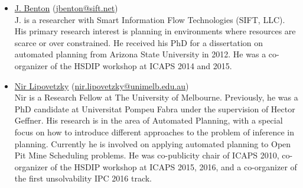 \documentclass[10pt]{article}
\begin{document}
\begin{itemize}


\item \href{http://www.sift.net/staff/j-benton}{J. Benton}
  (\href{mailto:jbenton@sift.net}{jbenton@sift.net})\\
  J. is a researcher with Smart Information Flow Technologies (SIFT, LLC). His
  primary research interest is planning in environments where
  resources are scarce or over constrained.  He received his PhD for a
  dissertation on automated planning from Arizona State University in
  2012. He was a co-organizer of the HSDIP workshop at
  ICAPS 2014 and 2015.

%


\item \href{http://people.eng.unimelb.edu.au/nlipovetzky/}{Nir Lipovetzky}
  (\href{mailto:nir.lipovetzky@unimelb.edu.au}{nir.lipovetzky@unimelb.edu.au})\\
Nir is a Research Fellow at The University of Melbourne. Previously, he was a
PhD candidate at Universitat Pompeu Fabra under the supervision of Hector Geffner.
His research is in the area of Automated Planning, with a special focus on how
to introduce different approaches to the problem of inference in planning.
Currently he is involved on applying automated planning to Open Pit Mine
Scheduling problems. He was co-publicity chair of ICAPS 2010, co-organizer
of the HSDIP workshop at ICAPS 2015, 2016, and a co-organizer of the first unsolvability
IPC 2016 track.


\end{itemize}
\end{document}
